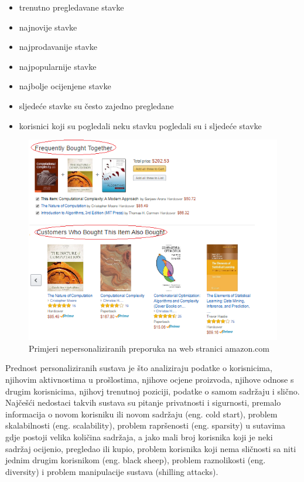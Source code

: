 \documentclass[a4paper,oneside,12pt]{memoir} %
\begin{document}
\begin{itemize}[topsep=2pt]
\setlength{\parskip}{0pt}
\item trenutno pregledavane stavke
\item najnovije stavke
\item najprodavanije stavke
\item najpopularnije stavke
\item najbolje ocijenjene stavke
\item sljedeće stavke su često zajedno pregledane
\item korisnici koji su pogledali neku stavku pogledali su i sljedeće stavke
\end{itemize}
\bigskip
\begin{figure}[!h]
\begin{center}
\includegraphics[scale=1]{slike/amazon-non_personalized_recom.png}
\caption{Primjeri nepersonaliziranih preporuka na web stranici amazon.com}
\end{center}
\end{figure}
%
\par Prednost personaliziranih sustava je što analiziraju podatke o korisnicima, njihovim aktivnostima u prošlostima, njihove ocjene proizvoda, njihove odnose s drugim korisnicima, njihovj trenutnoj poziciji, podatke o samom sadržaju i slično. Najčešći nedostaci takvih sustava su pitanje privatnosti i sigurnosti, premalo informacija o novom korisniku ili novom sadržaju (eng. cold start), problem skalabilnosti (eng. scalability), problem rapršenosti (eng. sparsity) u sutavima gdje postoji velika količina sadržaja, a jako mali broj korisnika koji je neki sadržaj ocijenio, pregledao ili kupio, problem korisnika koji nema sličnosti sa niti jednim drugim korisnikom (eng. black sheep), problem raznolikosti (eng. diversity) i problem manipulacije sustava (shilling attacks).
\end{document}
